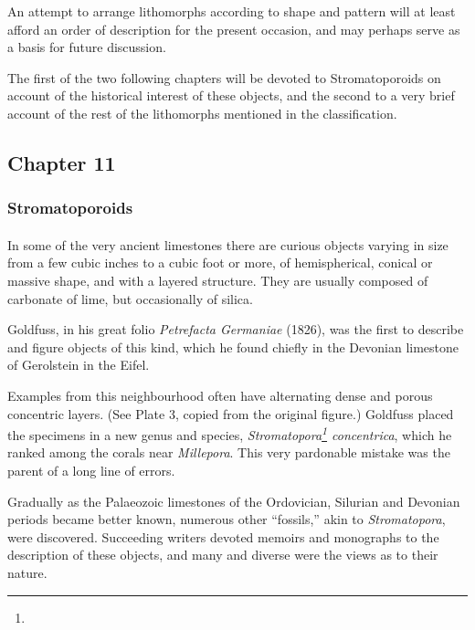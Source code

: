 \documentclass[a4paper, 12pt, oneside]{article}
\begin{document}
An attempt to arrange lithomorphs according to shape and pattern will at least afford an order of description for the present occasion, and may perhaps serve as a basis for future discussion.

The first of the two following chapters will be devoted to Stromatoporoids on account of the historical interest of these objects, and the second to a very brief account of the rest of the lithomorphs mentioned in the classification.
\clearpage
\subsection{Chapter 11}
\subsubsection{Stromatoporoids}
\paragraph{}
In some of the very ancient limestones there are curious objects varying in size from a few cubic inches to a cubic foot or more, of hemispherical, conical or massive shape, and with a layered structure. They are usually composed of carbonate of lime, but occasionally of silica.

Goldfuss, in his great folio \emph{Petrefacta Germaniae} (1826), was the first to describe and figure objects of this kind, which he found chiefly in the Devonian limestone of Gerolstein in the Eifel.

Examples from this neighbourhood often have alternating dense and porous concentric layers. (See Plate 3, copied from the original figure.) Goldfuss placed the specimens in a new genus and species, \emph{Stromatopora\footnote{} concentrica}, which he ranked among the corals near \emph{Millepora}. This very pardonable mistake was the parent of a long line of errors.

Gradually as the Palaeozoic limestones of the Ordovician, Silurian and Devonian periods became better known, numerous other ``fossils,'' akin to \emph{Stromatopora}, were discovered. Succeeding writers devoted memoirs and monographs to the description of these objects, and many and diverse were the views as to their nature.
\end{document}
